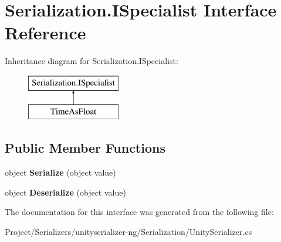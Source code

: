 \hypertarget{interface_serialization_1_1_i_specialist}{}\section{Serialization.\+I\+Specialist Interface Reference}
\label{interface_serialization_1_1_i_specialist}
Inheritance diagram for Serialization.\+I\+Specialist\+:\begin{figure}[H]
\begin{center}
\leavevmode
\includegraphics[height=2.000000cm]{interface_serialization_1_1_i_specialist}
\end{center}
\end{figure}
\subsection*{Public Member Functions}
\begin{DoxyCompactItemize}
\item 
\mbox{\label{interface_serialization_1_1_i_specialist_adf11f6ab173de9fe3c26e3cbee292c92}} 
object {\bfseries Serialize} (object value)
\item 
\mbox{\label{interface_serialization_1_1_i_specialist_a90d5a229aacd71121934630932df0f1a}} 
object {\bfseries Deserialize} (object value)
\end{DoxyCompactItemize}


The documentation for this interface was generated from the following file\+:\begin{DoxyCompactItemize}
\item 
Project/\+Serializers/unityserializer-\/ng/\+Serialization/Unity\+Serializer.\+cs\end{DoxyCompactItemize}
